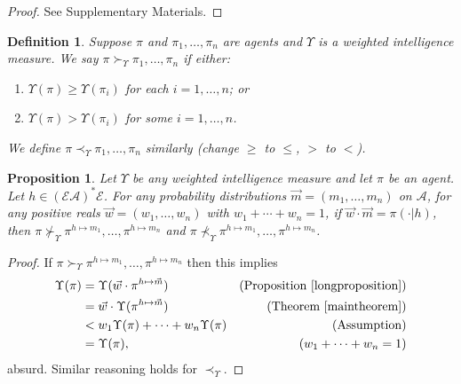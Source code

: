 \documentclass[twoside]{article}
\newtheorem{definition}[theorem]{Definition}
\newtheorem{proposition}[theorem]{Proposition}
\begin{document}
\begin{proof}
    See Supplementary Materials.
\end{proof}

\begin{definition}
    Suppose $\pi$ and $\pi_1,\ldots,\pi_n$ are agents and $\Upsilon$ is a
    weighted intelligence measure.
    We say $\pi\succ_\Upsilon \pi_1,\ldots,\pi_n$
    if either:
    \begin{enumerate}
        \item $\Upsilon(\pi)\geq \Upsilon(\pi_i)$ for each $i=1,\ldots,n$; or
        \item $\Upsilon(\pi)>\Upsilon(\pi_i)$ for some $i=1,\ldots,n$.
    \end{enumerate}
    We define $\pi\prec_\Upsilon\pi_1,\ldots,\pi_n$ similarly (change $\geq$ to $\leq$,
    $>$ to $<$).
\end{definition}

\begin{proposition}
\label{pointwisegenericnessthm}
    Let $\Upsilon$ be any weighted intelligence measure and let
    $\pi$ be an agent.
    Let $h\in (\mathcal E\mathcal A)^*\mathcal E$.
    For any probability distributions $\vec m=(m_1,\ldots,m_n)$ on $\mathcal A$,
    for any positive reals $\vec w=(w_1,\ldots,w_n)$ with $w_1+\cdots+w_n=1$,
    if $\vec w\cdot\vec m=\pi(\cdot|h)$,
    then $\pi\not\succ_\Upsilon \pi^{h\mapsto m_1},\ldots,\pi^{h\mapsto m_n}$
    and $\pi\not\prec_\Upsilon \pi^{h\mapsto m_1},\ldots,\pi^{h\mapsto m_n}$.
\end{proposition}

\begin{proof}
    If $\pi\succ_\Upsilon\pi^{h\mapsto m_1},\ldots,\pi^{h\mapsto m_n}$
    then this implies
    \begin{align*}
        \Upsilon(\pi)
            &= \Upsilon(\vec w\cdot\pi^{h\mapsto\vec m})
                &\mbox{(Proposition \ref{longproposition})}\\
            &= \vec w\cdot\Upsilon(\pi^{h\mapsto\vec m})
                &\mbox{(Theorem \ref{maintheorem})}\\
            &< w_1\Upsilon(\pi)+\cdots+w_n\Upsilon(\pi)
                &\mbox{(Assumption)}\\
            &= \Upsilon(\pi),
                &\mbox{($w_1+\cdots+w_n=1$)}
    \end{align*}
    absurd. Similar reasoning holds for $\prec_\Upsilon$.
\end{proof}
\end{document}

